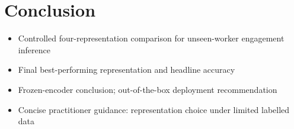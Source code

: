 \section{Conclusion}

\begin{itemize}
  \item Controlled four-representation comparison for unseen-worker engagement inference
  \item Final best-performing representation and headline accuracy
  \item Frozen-encoder conclusion; out-of-the-box deployment recommendation
  \item Concise practitioner guidance: representation choice under limited labelled data
\end{itemize}
